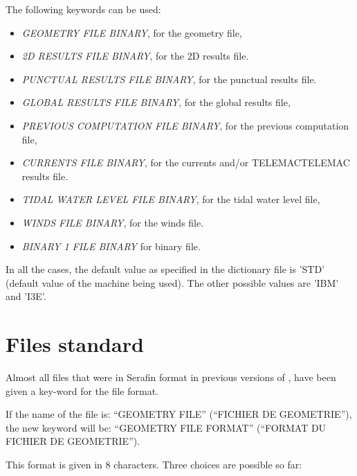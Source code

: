  The following keywords can be used:

\begin{itemize}
\item  \textit{GEOMETRY FILE BINARY}, for the geometry file,

\item  \textit{2D RESULTS FILE BINARY}, for the 2D results file.

\item  \textit{PUNCTUAL RESULTS FILE BINARY}, for the punctual results file.

\item  \textit{GLOBAL RESULTS FILE BINARY}, for the global results file,

\item  \textit{PREVIOUS COMPUTATION FILE BINARY}, for the previous computation file,

\item  \textit{CURRENTS FILE BINARY}, for the currents and/or TELEMACTELEMAC results file.

\item  \textit{TIDAL WATER LEVEL FILE BINARY}, for the tidal water level file,

\item  \textit{WINDS FILE BINARY}, for the winds file.

\item  \textit{BINARY 1 FILE BINARY }for binary file.
\end{itemize}

 In all the cases, the default value as specified in the dictionary file is 'STD' (default value of the machine being used). The other possible values are 'IBM' and 'I3E'.


\section{ Files standard}

 Almost all files that were in Serafin format in previous versions of \tomawac, have been given a key-word for the file format.

 If the name of the file is: ``GEOMETRY FILE'' (``FICHIER DE GEOMETRIE''), the new keyword will be: ``GEOMETRY FILE FORMAT'' (``FORMAT DU FICHIER DE GEOMETRIE'').

 This format is given in 8 characters. Three choices are possible so far:

